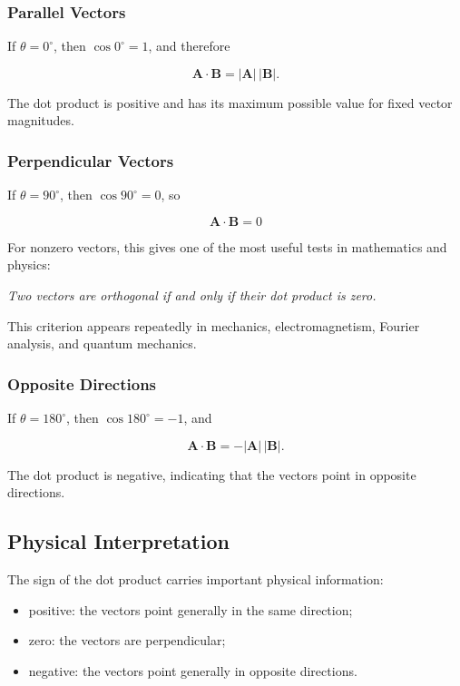 \subsubsection{Parallel Vectors}

If $\theta=0^{\circ}$, then $\cos 0^{\circ}=1$, and therefore

\[
\mathbf A\cdot\mathbf B
=
\lvert\mathbf A\rvert\,\lvert\mathbf B\rvert.
\]

The dot product is positive and has its maximum possible value for fixed vector
magnitudes.

\subsubsection{Perpendicular Vectors}

If $\theta=90^{\circ}$, then $\cos 90^{\circ}=0$, so

\[
\boxed{
\mathbf A\cdot\mathbf B=0
}
\]

For nonzero vectors, this gives one of the most useful tests in mathematics and
physics:

\begin{center}
\emph{Two vectors are orthogonal if and only if their dot product is zero.}
\end{center}

This criterion appears repeatedly in mechanics, electromagnetism, Fourier
analysis, and quantum mechanics.

\subsubsection{Opposite Directions}

If $\theta=180^{\circ}$, then $\cos 180^{\circ}=-1$, and

\[
\mathbf A\cdot\mathbf B
=-\lvert\mathbf A\rvert\,\lvert\mathbf B\rvert.
\]

The dot product is negative, indicating that the vectors point in opposite
directions.

\subsection{Physical Interpretation}

The sign of the dot product carries important physical information:

\begin{itemize}
  \item positive: the vectors point generally in the same direction;
  \item zero: the vectors are perpendicular;
  \item negative: the vectors point generally in opposite directions.
\end{itemize}

